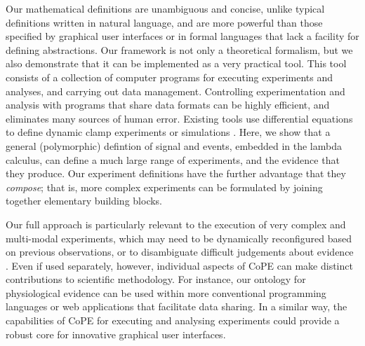 %
% 
%
Our mathematical definitions are unambiguous and concise, unlike
typical definitions written in natural language, and are more powerful
than those specified by graphical user interfaces or in formal
languages that lack a facility for defining abstractions. Our
framework is not only a theoretical formalism, but we also demonstrate
that it can be implemented as a very practical tool. This tool
consists of a collection of computer programs for executing
experiments and analyses, and carrying out data
management. Controlling experimentation and analysis with programs
that share data formats can be highly efficient, and eliminates many
sources of human error. Existing tools use differential equations to
define dynamic clamp experiments \citep[Model Reference Current
Injection (MRCI);][]{Raikov2004} or simulations \citep[X-Windows Phase
Plane (XPP);][]{Ermentrout1987}. Here, we show that a general
(polymorphic) defintion of signal and events, embedded in the lambda
calculus, can define a much large range of experiments, and the
evidence that they produce. Our experiment definitions have the
further advantage that they \emph{compose}; that is, more complex
experiments can be formulated by joining together elementary building
blocks.


Our full approach is particularly relevant to the execution of very
complex and multi-modal experiments, which may need to be dynamically
reconfigured based on previous observations, or to disambiguate
difficult judgements about evidence \citep{Kriegeskorte2009}. Even
if used separately, however, individual aspects of CoPE can make
distinct contributions to scientific methodology. For instance, our
ontology for physiological evidence can be used within more
conventional programming languages or web applications that facilitate
data sharing. In a similar way, the capabilities of CoPE for executing
and analysing experiments could provide a robust core for innovative
graphical user interfaces.


